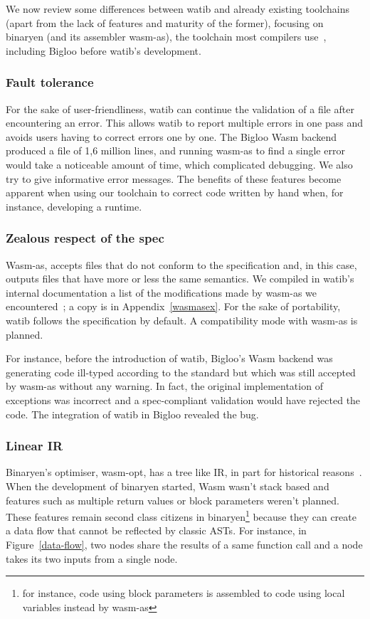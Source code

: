 \documentclass[a4paper,11pt]{article}
\begin{document}
We now review some differences between \textsf{watib} and already existing
toolchains (apart from the lack of features and maturity of the former),
focusing on binaryen (and its assembler \textsf{wasm-as}), the toolchain most
compilers use~\cite{Binaryen}, including Bigloo before \textsf{watib}'s
development.
\subsubsection{Fault tolerance}
For the sake of user-friendliness, \textsf{watib} can continue the validation of
a file after encountering an error. This allows \textsf{watib} to report
multiple errors in one pass and avoids users having to correct errors one by
one. The Bigloo Wasm backend produced a file of 1,6 million lines, and running
\textsf{wasm-as} to find a single error would take a noticeable amount of time,
which complicated debugging. We also try to give informative error messages. The
benefits of these features become apparent when using our toolchain to correct
code written by hand when, for instance, developing a runtime.

\subsubsection{{Zealous\protect\footnotemark} respect of the spec}
\textsf{Wasm-as}, accepts files that do not conform to the specification and, in
this case, outputs files that have more or less the same semantics. We compiled
in \textsf{watib}'s internal documentation a list of the modifications made by
\textsf{wasm-as} we encountered~\cite{WasmAsExtension}; a copy is in
Appendix~\ref{wasmasex}. For the sake of portability, \textsf{watib} follows the
specification by default. A compatibility mode with \textsf{wasm-as} is
planned.

For instance, before the introduction of \textsf{watib}, Bigloo's Wasm backend
was generating code ill-typed according to the standard but which was still
accepted by \textsf{wasm-as} without any warning. In fact, the original
implementation of exceptions was incorrect and a spec-compliant validation would
have rejected the code. The integration of \textsf{watib} in Bigloo revealed the
bug.

\subsubsection{Linear IR}
Binaryen's optimiser, \textsf{wasm-opt}, has a tree like IR, in part for
historical reasons~\cite{BinaryenIR}. When the development of binaryen started,
Wasm wasn't stack based and features such as multiple return values or block
parameters weren't planned. These features remain second class citizens in
binaryen\footnote{for instance, code using block parameters is assembled to code
using local variables instead by \textsf{wasm-as}} because they can create a
data flow that cannot be reflected by classic ASTs. For instance, in
Figure~\ref{data-flow}, two nodes share the results of a same function call and
a node takes its two inputs from a single node.
\end{document}
